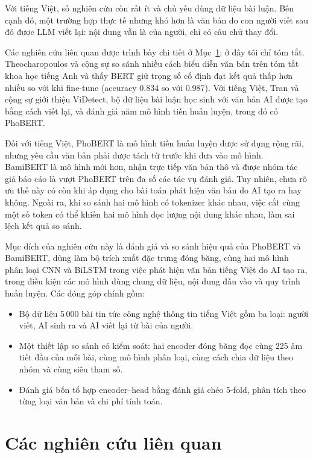\documentclass[conference,a4paper]{IEEEtran}
\begin{document}
Với tiếng Việt, số nghiên cứu còn rất ít và chủ yếu dùng dữ liệu bài luận. Bên cạnh đó, một trường hợp thực tế nhưng khó hơn là văn bản do con người viết sau đó được LLM viết lại: nội dung vẫn là của người, chỉ có câu chữ thay đổi.

Các nghiên cứu liên quan được trình bày chi tiết ở Mục~\ref{sec:related}; ở đây tôi chỉ tóm tắt. Theocharopoulos và cộng sự \cite{theocharopoulos} so sánh nhiều cách biểu diễn văn bản trên tóm tắt khoa học tiếng Anh và thấy BERT giữ trọng số cố định đạt kết quả thấp hơn nhiều so với khi fine-tune (accuracy 0.834 so với 0.987). Với tiếng Việt, Tran và cộng sự \cite{videtect} giới thiệu ViDetect, bộ dữ liệu bài luận học sinh với văn bản AI được tạo bằng cách viết lại, và đánh giá năm mô hình tiền huấn luyện, trong đó có PhoBERT.

Đối với tiếng Việt, PhoBERT \cite{phobert} là mô hình tiền huấn luyện được sử dụng rộng rãi, nhưng yêu cầu văn bản phải được tách từ trước khi đưa vào mô hình. BamiBERT \cite{bamibert} là mô hình mới hơn, nhận trực tiếp văn bản thô và được nhóm tác giả báo cáo là vượt PhoBERT trên đa số các tác vụ đánh giá. Tuy nhiên, chưa rõ ưu thế này có còn khi áp dụng cho bài toán phát hiện văn bản do AI tạo ra hay không. Ngoài ra, khi so sánh hai mô hình có tokenizer khác nhau, việc cắt cùng một số token có thể khiến hai mô hình đọc lượng nội dung khác nhau, làm sai lệch kết quả so sánh.

Mục đích của nghiên cứu này là đánh giá và so sánh hiệu quả của PhoBERT và BamiBERT, dùng làm bộ trích xuất đặc trưng đóng băng, cùng hai mô hình phân loại CNN và BiLSTM trong việc phát hiện văn bản tiếng Việt do AI tạo ra, trong điều kiện các mô hình dùng chung dữ liệu, nội dung đầu vào và quy trình huấn luyện. Các đóng góp chính gồm:
\begin{itemize}
  \item Bộ dữ liệu 5\,000 bài tin tức công nghệ thông tin tiếng Việt gồm ba loại: người viết, AI sinh ra và AI viết lại từ bài của người.
  \item Một thiết lập so sánh có kiểm soát: hai encoder đóng băng đọc cùng 225 âm tiết đầu của mỗi bài, cùng mô hình phân loại, cùng cách chia dữ liệu theo nhóm và cùng siêu tham số.
  \item Đánh giá bốn tổ hợp encoder--head bằng đánh giá chéo 5-fold, phân tích theo từng loại văn bản và chi phí tính toán.
\end{itemize}

\section{Các nghiên cứu liên quan}
\label{sec:related}
\end{document}
